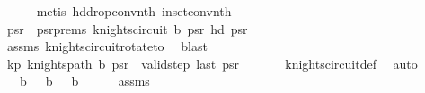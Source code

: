 \begin{isabellebody}
\ \ \ \ \isamarkupfalse%
\ {\isacharparenleft}{\kern0pt}metis\ hd{\isacharunderscore}{\kern0pt}drop{\isacharunderscore}{\kern0pt}conv{\isacharunderscore}{\kern0pt}nth\ in{\isacharunderscore}{\kern0pt}set{\isacharunderscore}{\kern0pt}conv{\isacharunderscore}{\kern0pt}nth{\isacharparenright}{\kern0pt}\isanewline
\ \ \isamarkupfalse%
\ \isamarkupfalse%
\ ps\isactrlsub r\ \ ps\isactrlsub r{\isacharunderscore}{\kern0pt}prems{\isacharcolon}{\kern0pt}\ {\isachardoublequoteopen}knights{\isacharunderscore}{\kern0pt}circuit\ {\isacharquery}{\kern0pt}b\ ps\isactrlsub r{\isachardoublequoteclose}\ {\isachardoublequoteopen}hd\ ps\isactrlsub r\ {\isacharequal}{\kern0pt}\ {\isacharparenleft}{\kern0pt}{}{\isacharcomma}{\kern0pt}{}{\isacharparenright}{\kern0pt}{\isachardoublequoteclose}\isanewline
\ \ \ \ \isamarkupfalse%
\ assms\ knights{\isacharunderscore}{\kern0pt}circuit{\isacharunderscore}{\kern0pt}rotate{\isacharunderscore}{\kern0pt}to\ \isamarkupfalse%
\ blast\isanewline
\ \ \isamarkupfalse%
\ \isamarkupfalse%
\ kp{\isacharcolon}{\kern0pt}\ {\isachardoublequoteopen}knights{\isacharunderscore}{\kern0pt}path\ {\isacharquery}{\kern0pt}b\ ps\isactrlsub r{\isachardoublequoteclose}\ \ {\isachardoublequoteopen}valid{\isacharunderscore}{\kern0pt}step\ {\isacharparenleft}{\kern0pt}last\ ps\isactrlsub r{\isacharparenright}{\kern0pt}\ {\isacharparenleft}{\kern0pt}{}{\isacharcomma}{\kern0pt}{}{\isacharparenright}{\kern0pt}{\isachardoublequoteclose}\isanewline
\ \ \ \ \isamarkupfalse%
\ knights{\isacharunderscore}{\kern0pt}circuit{\isacharunderscore}{\kern0pt}def\ \isamarkupfalse%
\ auto\isanewline
\isanewline
\ \ \isamarkupfalse%
\ {\isachardoublequoteopen}{\isacharparenleft}{\kern0pt}{}{\isacharcomma}{\kern0pt}{}{\isacharparenright}{\kern0pt}\ {\isasymin}\ {\isacharquery}{\kern0pt}b{\isachardoublequoteclose}\ {\isachardoublequoteopen}{\isacharparenleft}{\kern0pt}{}{\isacharcomma}{\kern0pt}{}{\isacharparenright}{\kern0pt}\ {\isasymin}\ {\isacharquery}{\kern0pt}b{\isachardoublequoteclose}\ {\isachardoublequoteopen}{\isacharparenleft}{\kern0pt}{}{\isacharcomma}{\kern0pt}{}{\isacharparenright}{\kern0pt}\ {\isasymin}\ {\isacharquery}{\kern0pt}b{\isachardoublequoteclose}\isanewline
\ \ \ \ \isamarkupfalse%
\ assms\ \isamarkupfalse%

\end{isabellebody}
